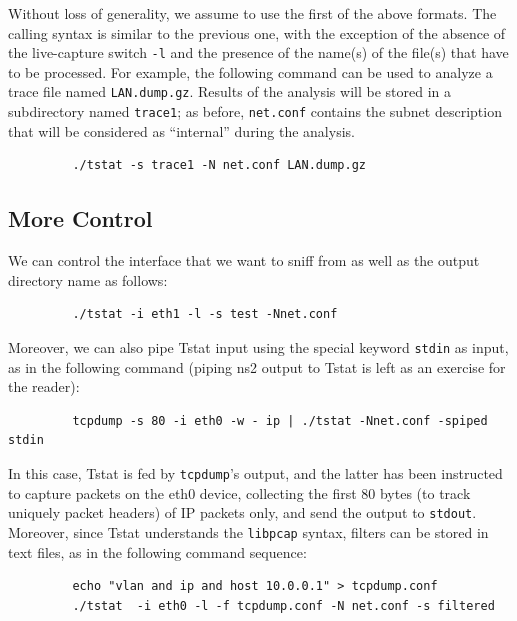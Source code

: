 \documentclass[11pt]{article}
\begin{document}
Without loss of generality, we assume to use the first of the above formats. The
calling syntax is similar to the previous one, with the exception of the absence
of the live-capture switch \texttt{-l} and the presence of the name(s) of the file(s)
that have to be processed. For example, the following command can be used to
analyze a trace file named \texttt{LAN.dump.gz}. Results of the analysis
will be stored in a subdirectory named \texttt{trace1}; as before, \texttt{net.conf} contains  the
subnet description that will be considered as ``internal'' during the
analysis.

\begin{small}\begin{verbatim}
         ./tstat -s trace1 -N net.conf LAN.dump.gz
\end{verbatim}\end{small} \noindent
\subsection{More Control\label{More_Control}}


We can control the interface that we want to sniff from as well as
the output directory name as follows:

\begin{small}\begin{verbatim}
         ./tstat -i eth1 -l -s test -Nnet.conf
\end{verbatim}\end{small} \noindent
Moreover, we can also pipe Tstat input using the special keyword
\texttt{stdin} as input, as in the following command (piping ns2 output to 
Tstat is left as an exercise for the reader):

\begin{small}\begin{verbatim}
         tcpdump -s 80 -i eth0 -w - ip | ./tstat -Nnet.conf -spiped stdin
\end{verbatim}\end{small} \noindent
In this case, Tstat is fed by \texttt{tcpdump}'s output, and the latter has been
instructed to capture packets on the eth0 device, collecting the
first 80 bytes (to track uniquely packet headers) of IP packets only, 
and send the output to \texttt{stdout}. Moreover, since Tstat understands 
the \texttt{libpcap} syntax, filters can be stored in text files, as in 
the following command sequence:

\begin{small}\begin{verbatim}
         echo "vlan and ip and host 10.0.0.1" > tcpdump.conf
         ./tstat  -i eth0 -l -f tcpdump.conf -N net.conf -s filtered
\end{verbatim}\end{small} \noindent
\end{document}
